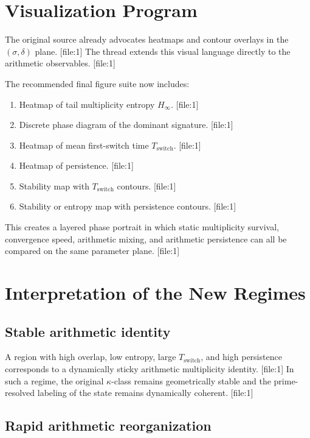 \documentclass[11pt]{article}
\begin{document}
\section{Visualization Program}

The original source already advocates heatmaps and contour overlays in the $(\sigma,\delta)$ plane. [file:1] The thread extends this visual language directly to the arithmetic observables. [file:1]

The recommended final figure suite now includes:
\begin{enumerate}
    \item Heatmap of tail multiplicity entropy $H_{\infty}$. [file:1]
    \item Discrete phase diagram of the dominant signature. [file:1]
    \item Heatmap of mean first-switch time $T_{\mathrm{switch}}$. [file:1]
    \item Heatmap of persistence. [file:1]
    \item Stability map with $T_{\mathrm{switch}}$ contours. [file:1]
    \item Stability or entropy map with persistence contours. [file:1]
\end{enumerate}

This creates a layered phase portrait in which static multiplicity survival, convergence speed, arithmetic mixing, and arithmetic persistence can all be compared on the same parameter plane. [file:1]

\section{Interpretation of the New Regimes}

\subsection{Stable arithmetic identity}

A region with high overlap, low entropy, large $T_{\mathrm{switch}}$, and high persistence corresponds to a dynamically sticky arithmetic multiplicity identity. [file:1] In such a regime, the original $\kappa$-class remains geometrically stable and the prime-resolved labeling of the state remains dynamically coherent. [file:1]

\subsection{Rapid arithmetic reorganization}
\end{document}
